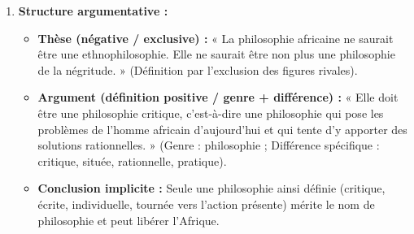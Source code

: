 \documentclass[11pt]{article}
\begin{document}
\begin{corrige}
\begin{enumerate}
\begin{enumerate}
\end{enumerate}
Sans « critique », pas de philosophie au sens fort : seulement opinion, doxa, ou idéologie.
\item \textbf{Structure argumentative :}
\begin{itemize}
\item \textbf{Thèse (négative / exclusive) :} « La philosophie africaine ne saurait être une ethnophilosophie. Elle ne saurait être non plus une philosophie de la négritude. » (Définition par l'exclusion des figures rivales).
\item \textbf{Argument (définition positive / genre + différence) :} « Elle doit être une philosophie critique, c'est-à-dire une philosophie qui pose les problèmes de l'homme africain d'aujourd'hui et qui tente d'y apporter des solutions rationnelles. » (Genre : philosophie ; Différence spécifique : critique, située, rationnelle, pratique).
\item \textbf{Conclusion implicite :} Seule une philosophie ainsi définie (critique, écrite, individuelle, tournée vers l'action présente) mérite le nom de philosophie et peut libérer l'Afrique.
\end{itemize}
\end{enumerate}
\end{corrige}
\end{document}
